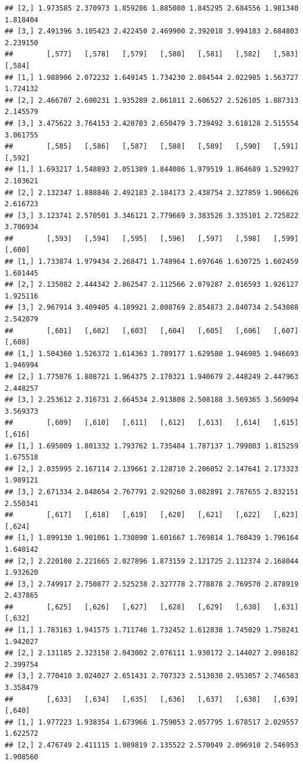 \documentclass[article]{jss}\usepackage[]{graphicx}\usepackage[]{xcolor}
\makeatletter
\newenvironment{kframe}{%
 \def\at@end@of@kframe{}%
 \ifinner\ifhmode%
  \def\at@end@of@kframe{\end{minipage}}%
  \begin{minipage}{\columnwidth}%
 \fi\fi%
 \def\FrameCommand##1{\hskip\@totalleftmargin \hskip-\fboxsep
 \colorbox{shadecolor}{##1}\hskip-\fboxsep
     \hskip-\linewidth \hskip-\@totalleftmargin \hskip\columnwidth}%
 \MakeFramed {\advance\hsize-\width
   \@totalleftmargin\z@ \linewidth\hsize
   \@setminipage}}%
 {\par\unskip\endMakeFramed%
 \at@end@of@kframe}
\newenvironment{knitrout}{}{} %
\makeatother
\begin{document}
\begin{knitrout}
\begin{kframe}
\begin{verbatim}
## [2,] 1.973585 2.370973 1.859286 1.885080 1.845295 2.684556 1.981340 1.818404
## [3,] 2.491396 3.105423 2.422450 2.469900 2.392018 3.994183 2.684803 2.239150
##        [,577]   [,578]   [,579]   [,580]   [,581]   [,582]   [,583]   [,584]
## [1,] 1.988906 2.072232 1.649145 1.734230 2.084544 2.022985 1.563727 1.724132
## [2,] 2.466707 2.600231 1.935289 2.061811 2.606527 2.526105 1.887313 2.145579
## [3,] 3.475622 3.764153 2.420783 2.650479 3.739492 3.618128 2.515554 3.061755
##        [,585]   [,586]   [,587]   [,588]   [,589]   [,590]   [,591]   [,592]
## [1,] 1.693217 1.548893 2.051389 1.844086 1.979519 1.864689 1.529927 2.103621
## [2,] 2.132347 1.888846 2.492183 2.184173 2.438754 2.327859 1.906626 2.616723
## [3,] 3.123741 2.570501 3.346121 2.779669 3.383526 3.335101 2.725822 3.706934
##        [,593]   [,594]   [,595]   [,596]   [,597]   [,598]   [,599]   [,600]
## [1,] 1.733874 1.979434 2.268471 1.748964 1.697646 1.630725 1.602459 1.601445
## [2,] 2.135082 2.444342 2.862547 2.112566 2.079287 2.016593 1.926127 1.925116
## [3,] 2.967914 3.409405 4.189921 2.808769 2.854873 2.840734 2.543088 2.542079
##        [,601]   [,602]   [,603]   [,604]   [,605]   [,606]   [,607]   [,608]
## [1,] 1.504360 1.526372 1.614363 1.789177 1.629580 1.946985 1.946693 1.946994
## [2,] 1.775076 1.808721 1.964375 2.170321 1.940679 2.448249 2.447963 2.448257
## [3,] 2.253612 2.316731 2.664534 2.913808 2.508188 3.569365 3.569094 3.569373
##        [,609]   [,610]   [,611]   [,612]   [,613]   [,614]   [,615]   [,616]
## [1,] 1.695009 1.801332 1.793762 1.735484 1.787137 1.799803 1.815259 1.675518
## [2,] 2.035995 2.167114 2.139661 2.128710 2.206052 2.147641 2.173323 1.989121
## [3,] 2.671334 2.848654 2.767791 2.929260 3.082891 2.787655 2.832151 2.550341
##        [,617]   [,618]   [,619]   [,620]   [,621]   [,622]   [,623]   [,624]
## [1,] 1.899130 1.901061 1.730890 1.601667 1.769814 1.760439 1.796164 1.640142
## [2,] 2.220100 2.221665 2.027896 1.873159 2.121725 2.112374 2.168044 1.932620
## [3,] 2.749917 2.750877 2.525238 2.327778 2.778878 2.769570 2.878919 2.437865
##        [,625]   [,626]   [,627]   [,628]   [,629]   [,630]   [,631]   [,632]
## [1,] 1.783163 1.941575 1.711746 1.732452 1.612838 1.745029 1.750241 1.942027
## [2,] 2.131185 2.323158 2.043002 2.076111 1.930172 2.144027 2.098182 2.399754
## [3,] 2.770410 3.024027 2.651431 2.707323 2.513030 2.953057 2.746583 3.358479
##        [,633]   [,634]   [,635]   [,636]   [,637]   [,638]   [,639]   [,640]
## [1,] 1.977223 1.938354 1.673966 1.759053 2.057795 1.678517 2.029557 1.622572
## [2,] 2.476749 2.411115 1.989819 2.135522 2.570049 2.096910 2.546953 1.908560

\end{verbatim}
\end{kframe}
\end{knitrout}
\end{document}
